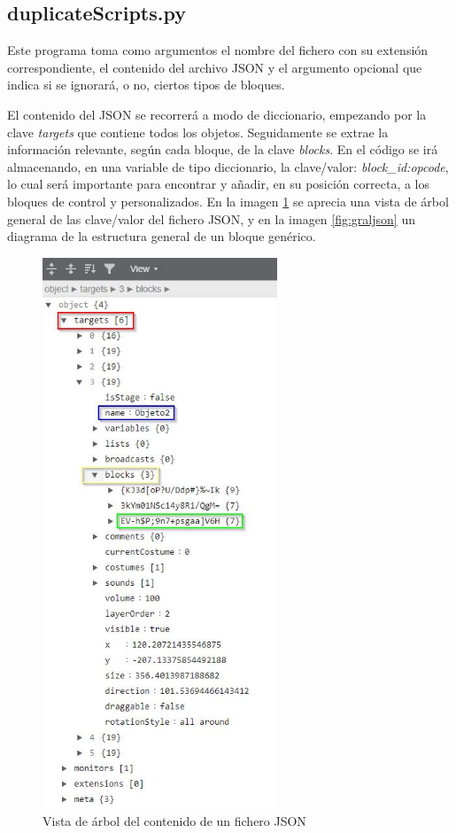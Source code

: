 \documentclass[a4paper, 12pt]{book}
\begin{document}
\subsection{duplicateScripts.py}

Este programa toma como argumentos el nombre del fichero con su extensión correspondiente, el contenido del archivo JSON y el argumento opcional que indica si se ignorará, o no, ciertos tipos de bloques.

El contenido del JSON se recorrerá a modo de diccionario, empezando por la clave \textit{targets} que contiene todos los objetos. Seguidamente se extrae la información relevante, según cada bloque, de la clave \textit{blocks}. En el código se irá almacenando, en una variable de tipo diccionario, la clave/valor: \textit{block\_id:opcode}, lo cual será importante para encontrar y añadir, en su posición correcta, a los bloques de control y personalizados. En la imagen \ref{fig:arboljson} se aprecia una vista de árbol general de las clave/valor del fichero JSON, y en la imagen \ref{fig:graljson} un diagrama de la estructura general de un bloque genérico.

\begin{figure}[!htb]
  \centering
  \includegraphics[width=7cm, keepaspectratio]{img/jsontree.jpg}
  \caption{Vista de árbol del contenido de un fichero JSON}
  \label{fig:arboljson}
\end{figure}
\end{document}
